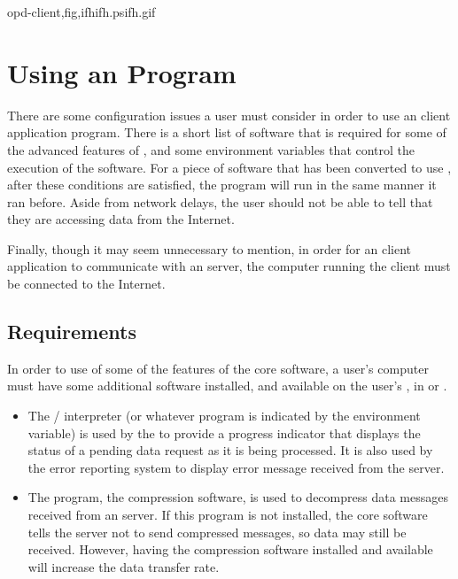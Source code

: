 {opd-client,fig,ifh}{ifh.ps}{ifh.gif}{}

\section{Using an \opendap Program}
\label{opd-client,using}

  There are some
configuration issues a user must consider in order to use an \opendap
client application program. There is a short list of software that is
required for some of the advanced features of \opendap, and some
environment variables that control the execution of the \opendap software.
For a piece of software that has been converted to use \opendap, after
these conditions are satisfied, the program will run in the same
manner it ran before. Aside from network delays, the user should not
be able to tell that they are accessing data from the Internet.

Finally, though it may seem unnecessary to mention, in order for an \opendap client application to communicate with an \opendap server, the
computer running the \opendap client must be connected to the Internet.

\subsection{Requirements}

In order to use of some of the features of the \opendap core software, a
user's computer must have some additional software installed, and
available on the user's , in
 or .  
 
   

\begin{itemize}
  
\item The  {}/{} interpreter (or whatever
  program is indicated by the  environment variable) is
  used by the {\em{}} to provide a progress indicator
  that displays the status of a pending data request as it is being
  processed. It is also used by the error reporting system to display
  error message received from the server.  
  
\item The  program, the  compression
  software, is used to decompress data messages received from an \opendap
  server. If this program is not installed, the \opendap core software
  tells the server not to send compressed messages, so data may still
  be received.  However, having the compression software installed and
  available will increase the data transfer rate.

\end{itemize}

